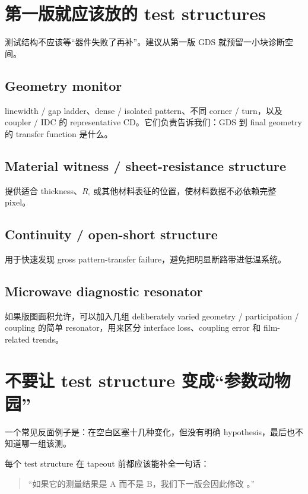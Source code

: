 \section{第一版就应该放的 test structures}

测试结构不应该等“器件失败了再补”。建议从第一版 GDS 就预留一小块诊断空间。

\subsection{Geometry monitor}

linewidth / gap ladder、dense / isolated pattern、不同 corner / turn，以及 coupler / IDC 的 representative CD。它们负责告诉我们：GDS 到 final geometry 的 transfer function 是什么。

\subsection{Material witness / sheet-resistance structure}

提供适合 thickness、$R_\square$ 或其他材料表征的位置，使材料数据不必依赖完整 pixel。

\subsection{Continuity / open-short structure}

用于快速发现 gross pattern-transfer failure，避免把明显断路带进低温系统。

\subsection{Microwave diagnostic resonator}

如果版图面积允许，可以加入几组 deliberately varied geometry / participation / coupling 的简单 resonator，用来区分 interface loss、coupling error 和 film-related trends。

\section{不要让 test structure 变成“参数动物园”}

一个常见反面例子是：在空白区塞十几种变化，但没有明确 hypothesis，最后也不知道哪一组该测。

每个 test structure 在 tapeout 前都应该能补全一句话：

\begin{quote}
“如果它的测量结果是 A 而不是 B，我们下一版会因此修改 \underline{\hspace{6em}}。”
\end{quote}

